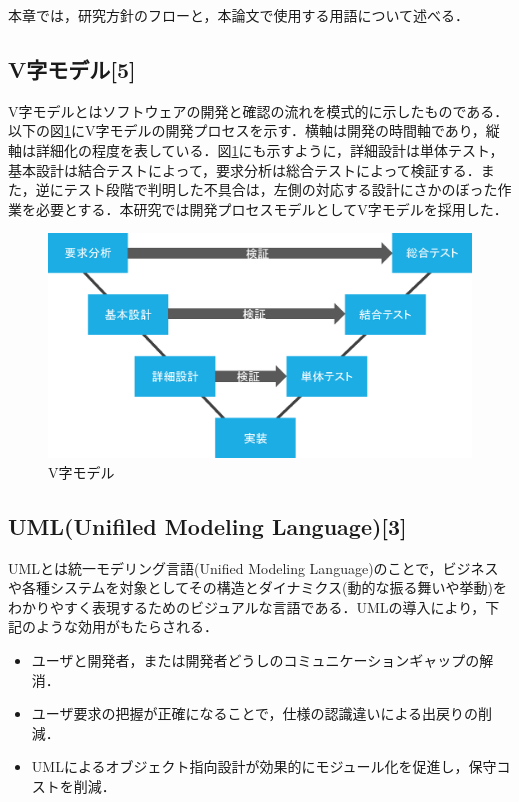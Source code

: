 

本章では，研究方針のフローと，本論文で使用する用語について述べる．

\subsection*{V字モデル[5]}

V字モデルとはソフトウェアの開発と確認の流れを模式的に示したものである．以下の図\ref{vji}にV字モデルの開発プロセスを示す．横軸は開発の時間軸であり，縦軸は詳細化の程度を表している\cite{kumikomi}．図\ref{vji}にも示すように，詳細設計は単体テスト，基本設計は結合テストによって，要求分析は総合テストによって検証する．また，逆にテスト段階で判明した不具合は，左側の対応する設計にさかのぼった作業を必要とする．本研究では開発プロセスモデルとしてV字モデルを採用した．

\begin{figure}[htbp]
\centering
\includegraphics[width=12cm]{./picture/vjimodel.eps}
\caption{V字モデル}
\label{vji}
\end{figure}


\subsection*{UML(Unifiled Modeling Language)[3]}

UMLとは統一モデリング言語(Unified Modeling Language)のことで，ビジネスや各種システムを対象としてその構造とダイナミクス(動的な振る舞いや挙動)をわかりやすく表現するためのビジュアルな言語である\cite{uml}．UMLの導入により，下記のような効用がもたらされる．

\begin{itemize}
\item ユーザと開発者，または開発者どうしのコミュニケーションギャップの解消．
\item ユーザ要求の把握が正確になることで，仕様の認識違いによる出戻りの削減．
\item UMLによるオブジェクト指向設計が効果的にモジュール化を促進し，保守コストを削減．
\end{itemize}


